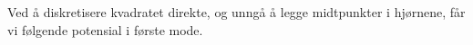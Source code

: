 Ved å diskretisere kvadratet direkte, og unngå å legge midtpunkter i hjørnene, får vi følgende potensial i første mode.
\begin{figure}[H]
  \scalebox{.6}{}
\end{figure}
